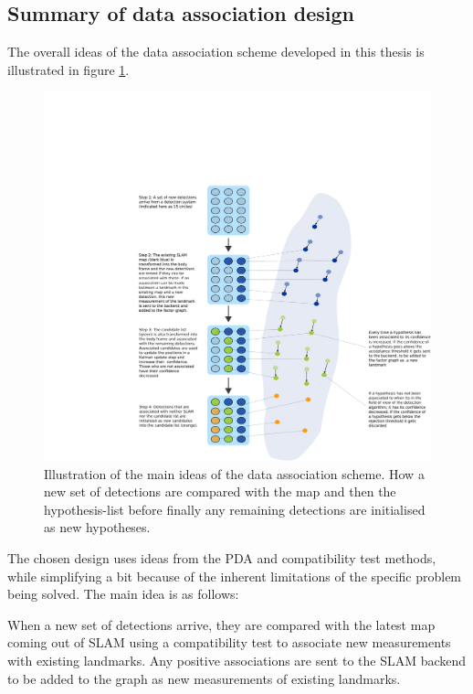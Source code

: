 \subsection{Summary of data association design}

The overall ideas of the data association scheme developed in this thesis is illustrated in figure \ref{Fig:FrontendDesign}. 

\begin{figure}
    \centering
    \includegraphics[width=\linewidth]{0_Images/3_Theory/sensor_fuser.pdf}
    \caption[Illustration of the main ideas of the data association scheme.]{Illustration of the main ideas of the data association scheme. How a new set of detections are compared with the map and then the hypothesis-list before finally any remaining detections are initialised as new hypotheses.}
    \label{Fig:FrontendDesign}
\end{figure}

The chosen design uses ideas from the \gls{PDA} and compatibility test methods, while simplifying a bit because of the inherent limitations of the specific problem being solved. The main idea is as follows:

When a new set of detections arrive, they are compared with the latest map coming out of \gls{SLAM} using a compatibility test to associate new measurements with existing landmarks. Any positive associations are sent to the \gls{SLAM} backend to be added to the graph as new measurements of existing landmarks.

